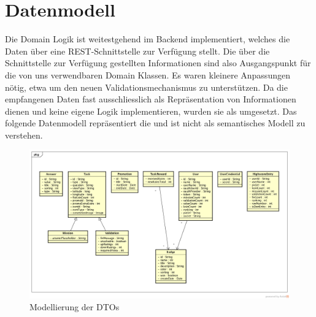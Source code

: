 \label{pd-datenmodell}
\section{Datenmodell}
Die Domain Logik ist weitestgehend im \gls{Backend} implementiert, welches die Daten über eine \gls{REST}-Schnittstelle zur Verfügung stellt.
Die über die Schnittstelle zur Verfügung gestellten Informationen sind also Ausgangspunkt für die von uns verwendbaren Domain Klassen.
Es waren kleinere Anpassungen nötig, etwa um den neuen Validationsmechanismus zu unterstützen.
Da die empfangenen Daten fast ausschliesslich als Repräsentation von Informationen dienen und keine eigene Logik implementieren, wurden sie als  umgesetzt.\newline
Das folgende Datenmodell repräsentiert die  und ist nicht als semantisches Modell zu verstehen.\newline
\begin{figure}[H]
 	\centering
 	\includegraphics[width=\textwidth]{images/projektdokumentation/Datenmodell.png}
 	\caption{Modellierung der DTOs}
 	\label{image-data-model}
\end{figure}
